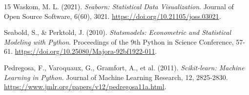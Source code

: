 \begin{thebibliography}{15}
Waskom, M. L. (2021).
\textit{Seaborn: Statistical Data Visualization}.
Journal of Open Source Software, 6(60), 3021.
\href{https://doi.org/10.21105/joss.03021}{https://doi.org/10.21105/joss.03021}.

Seabold, S., \& Perktold, J. (2010).
\textit{Statsmodels: Econometric and Statistical Modeling with Python}.
Proceedings of the 9th Python in Science Conference, 57-61.
\href{https://doi.org/10.25080/Majora-92bf1922-011}{https://doi.org/10.25080/Majora-92bf1922-011}.

Pedregosa, F., Varoquaux, G., Gramfort, A., et al. (2011).
\textit{Scikit-learn: Machine Learning in Python}.
Journal of Machine Learning Research, 12, 2825-2830.
\href{https://www.jmlr.org/papers/v12/pedregosa11a.html}{https://www.jmlr.org/papers/v12/pedregosa11a.html}.

    \end{thebibliography}

\endgroup
